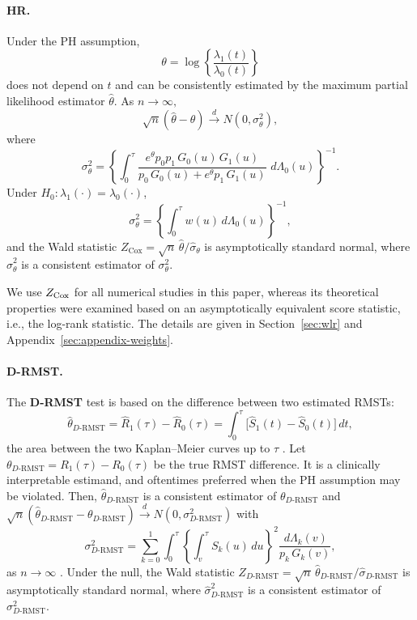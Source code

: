 \documentclass[12pt]{article}
\newcommand{\DRMST}{D\text{-}\mathrm{RMST}}
\newcommand{\dd}{\,d}
\begin{document}
\paragraph{HR.}
Under the PH assumption,
$$\theta=\log\left\{\frac{\lambda_1(t)}{\lambda_0(t)} \right\}$$
 does not depend on $t$ and can be consistently estimated by the maximum partial likelihood estimator $\hat{\theta}.$ As $n\to \infty,$
\[
  \sqrt n(\hat\theta-\theta)\xrightarrow{d}N(0,\sigma_\theta^2),
\]
where
\begin{equation}\label{eq:var-cox}
  \sigma_\theta^2
    =\left\{\int_0^{\tau}
       \frac{e^{\theta}p_0p_1\,G_0(u)\,G_1(u)}
            {p_0\,G_0(u)+e^{\theta}p_1\,G_1(u)}\,\dd\Lambda_0(u)
      \right\}^{-1}.
\end{equation}
Under $H_0:\lambda_1(\cdot)=\lambda_0(\cdot)$,
$$\sigma_\theta^2=\left\{\int_0^{\tau}w(u)\dd\Lambda_0(u)\right\}^{-1},$$
 and the
Wald statistic
\(
  Z_{\mathrm{Cox}}
    =\sqrt n\,\hat\theta/\hat\sigma_\theta
\)
is asymptotically standard normal, where $\hat{\sigma}_\theta^2$ is a consistent estimator of $\sigma_\theta^2.$

 We use $Z_{\rm Cox}$ for all numerical studies in this paper, whereas its theoretical properties were examined based on an asymptotically equivalent score statistic, i.e., the
log-rank statistic. The details are given in Section~\ref{sec:wlr} and Appendix~\ref{sec:appendix-weights}.

\paragraph{D-RMST.}
The \textbf{D-RMST} test is based on the difference between two estimated RMSTs:
\begin{equation}\label{eq:rmst-stat}
  \hat\theta_{\DRMST}=\hat R_1(\tau)-\hat R_0(\tau)
            =\int_0^\tau\bigl[\hat S_1(t)-\hat S_0(t)\bigr]\dd t,
\end{equation}
the area between the two Kaplan--Meier curves up to $\tau$
\citep{Uno2014,survRM2}. Let $\theta_{\DRMST}=R_1(\tau)-R_0(\tau)$ be the true RMST difference. It is a clinically interpretable estimand, and oftentimes preferred when the PH assumption may be violated.  Then, $\hat\theta_{\DRMST}$ is a consistent estimator of $\theta_{\DRMST}$ and
$\sqrt{n}(\hat\theta_{\DRMST}-\theta_{\DRMST})
\xrightarrow{d}N(0,\sigma_{\DRMST}^2)$ with
\begin{equation*}\label{eq:var-rmst}
  \sigma_{\DRMST}^2
    =\sum_{k=0}^{1}
     \int_0^\tau\!\left\{\int_v^\tau S_k(u)\dd u\right\}^{\!2}
     \frac{\dd\Lambda_k(v)}{p_k\,G_k(v)},
\end{equation*}
as $n \to \infty$
\citep{Tian2018}. Under the null, the Wald statistic
\(
  Z_{\DRMST}
    =\sqrt n\,\hat{\theta}_{\DRMST}/\hat\sigma_{\DRMST}
\)
is asymptotically standard normal, where $\hat{\sigma}_{\DRMST}^2$ is a consistent estimator of $\sigma_{\DRMST}^2.$
\end{document}
